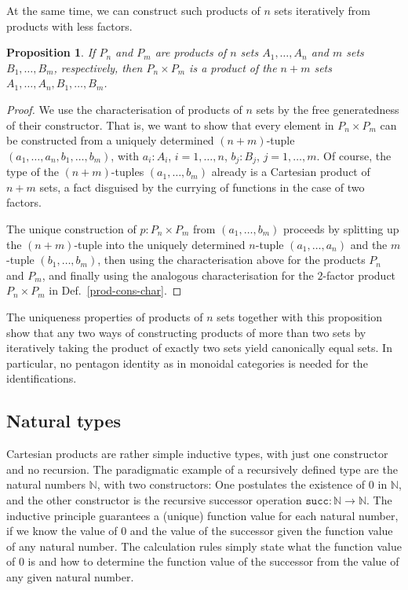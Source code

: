 \documentclass{amsart}
\theoremstyle{plain}
\numberwithin{equation}{section} %
\numberwithin{figure}{section} %
\theoremstyle{plain}
\theoremstyle{plain}
\theoremstyle{plain}
\theoremstyle{plain}
\theoremstyle{plain}
\newtheorem{prop}[thm]{Proposition} %
\theoremstyle{plain}
\theoremstyle{remark}
\theoremstyle{remark}
\theoremstyle{remark}
\begin{document}
At the same time, we can construct such products of $n$ sets iteratively from products with less factors.
\begin{prop}   %
If $P_n$ and $P_m$ are products of $n$ sets $A_1, \ldots, A_n$ and $m$ sets $B_1, \ldots, B_m$, respectively, then $P_n \times P_m$ is a product of the $n+m$ sets $A_1, \ldots, A_n, B_1, \ldots, B_m$.
\end{prop} 
\begin{proof}
We use the characterisation of products of $n$ sets by the free generatedness of their constructor. That is, we want to show that every element in $P_n \times P_m$ can be constructed from a uniquely determined $(n+m)$-tuple $(a_1, \ldots, a_n, b_1, \ldots, b_m)$, with $a_i : A_i$, $i = 1, \ldots, n$, $b_j : B_j$, $j = 1, \ldots, m$. Of course, the type of the $(n+m)$-tuples $(a_1, \ldots, b_m)$ already is a Cartesian product of $n+m$ sets, a fact disguised by the currying of functions in the case of two factors.

The unique construction of $p : P_n \times P_m$ from $(a_1, \ldots, b_m)$ proceeds by splitting up the $(n+m)$-tuple into the uniquely determined $n$-tuple $(a_1, \ldots, a_n)$ and the $m$-tuple $(b_1, \ldots, b_m)$, then using the characterisation above for the products $P_n$ and $P_m$, and finally using the analogous characterisation for the $2$-factor product $P_n \times P_m$ in Def.~\ref{prod-cons-char}.
\end{proof}

The uniqueness properties of products of $n$ sets together with this proposition show that any two ways of constructing products of more than two sets by iteratively taking the product of exactly two sets yield canonically equal sets. In particular, no pentagon identity as in monoidal categories is needed for the identifications.


\subsection{Natural types} \label{nat-type-ssec}

Cartesian products are rather simple inductive types, with just one constructor and no recursion. The paradigmatic example of a recursively defined type are the natural numbers $\mathbb{N}$, with two constructors: One postulates the existence of $0$ in $\mathbb{N}$, and the other constructor is the recursive successor operation $\mathtt{succ} : \mathbb{N} \rightarrow \mathbb{N}$. The inductive principle guarantees a (unique) function value for each natural number, if we know the value of $0$ and the value of the successor given the function value of any natural number. The calculation rules simply state what the function value of $0$ is and how to determine the function value of the successor from the value of any given natural number. 
\end{document}
